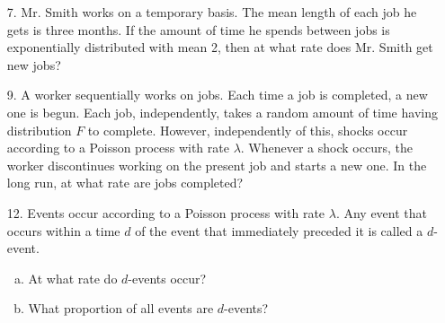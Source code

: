 \documentclass{article}
\begin{document}
\begin{itemize}
	\item[7.] Mr. Smith works on a temporary basis. The mean length of each job he gets is three months. If the amount of time he spends between jobs is exponentially distributed with mean 2, then at what rate does Mr. Smith get new jobs?

	\item[9.] A worker sequentially works on jobs. Each time a job is completed, a new one is begun. Each job, independently, takes a random amount of time having distribution $F$ to complete. However, independently of this, shocks occur according to a Poisson process with rate $\lambda.$ Whenever a shock occurs, the worker discontinues working on the present job and starts a new one. In the long run, at what rate are jobs completed?

	\item[12.] Events occur according to a Poisson process with rate $\lambda.$ Any event that occurs within a time $d$ of the event that immediately preceded it is called a $d$-event.
		\begin{enumerate}[(a)]
			\item At what rate do $d$-events occur?

			\item What proportion of all events are $d$-events?
				
		\end{enumerate}
		
\end{itemize}
\end{document}
